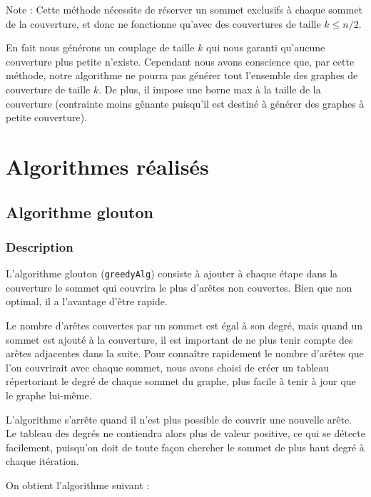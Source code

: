 \documentclass[a4paper,10pt]{article}
\begin{document}
Note : Cette méthode nécessite de réserver un sommet exclusifs à chaque sommet de la couverture, et donc ne fonctionne qu'avec des couvertures de taille $k\leqslant n/2$.

En fait nous générons un couplage de taille $k$ qui nous garanti qu'aucune couverture plus petite n'existe. Cependant nous avons conscience que, par cette méthode, notre algorithme ne pourra pas générer tout l'ensemble des graphes de couverture de taille $k$. De plus, il impose une borne max à la taille de la couverture (contrainte moins gênante puisqu'il est destiné à générer des graphes à petite couverture).

\section{Algorithmes réalisés}

\subsection{Algorithme glouton}

\subsubsection{Description}

L'algorithme glouton (\texttt{greedyAlg}) consiste à ajouter à chaque étape dans la couverture le sommet qui couvrira le plus d'arêtes non couvertes. Bien que non optimal, il a l'avantage d'être rapide. 

Le nombre d'arêtes couvertes par un sommet est égal à son degré, mais quand un sommet est ajouté à la couverture, il est important de ne plus tenir compte des arêtes adjacentes dans la suite. Pour connaître rapidement le nombre d'arêtes que l'on couvrirait avec chaque sommet, nous avons choisi de créer un tableau répertoriant le degré de chaque sommet du graphe, plus facile à tenir à jour que le graphe lui-même. 

L'algorithme s'arrête quand il n'est plus possible de couvrir une nouvelle arête. Le tableau des degrés ne contiendra alors plus de valeur positive, ce qui se détecte facilement, puisqu'on doit de toute façon chercher le sommet de plus haut degré à chaque itération.

On obtient l'algorithme suivant :
\end{document}
